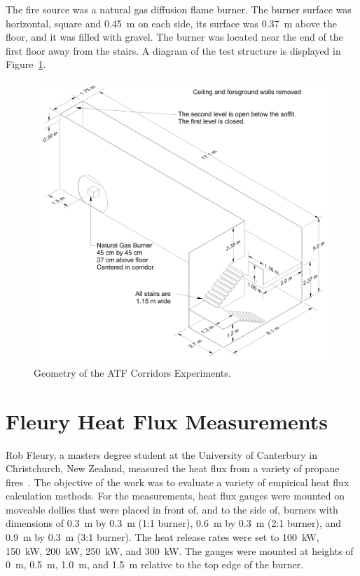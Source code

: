 The fire source was a natural gas diffusion flame burner.  The burner surface was horizontal, square and 0.45~m on each side, its surface was 0.37~m above the floor, and it was filled with gravel.
The burner was located near the end of the first floor away from the stairs. A diagram of the test structure is displayed in Figure~\ref{ATF Drawing}.


\begin{figure}[h]
\begin{center}
\includegraphics[width=6.5in]{FIGURES/ATF_Corridors/ATF_Corridors_Drawing}
\end{center}
\caption{Geometry of the ATF Corridors Experiments.}
\label{ATF Drawing}
\end{figure}


\section{Fleury Heat Flux Measurements}

Rob Fleury, a masters degree student at the University of Canterbury in Christchurch, New Zealand, measured the heat flux from a variety of propane fires~\cite{Fleury:Masters}.
The objective of the work was to evaluate a variety of empirical heat flux calculation methods. For the measurements, heat flux gauges were mounted on moveable dollies that
were placed in front of, and to the side of, burners with dimensions of 0.3~m by 0.3~m (1:1 burner), 0.6~m by 0.3~m (2:1 burner), and 0.9~m by 0.3~m (3:1 burner). The heat release
rates were set to 100~kW, 150~kW, 200~kW, 250~kW, and 300~kW. The gauges were mounted at heights of 0~m, 0.5~m, 1.0~m, and 1.5~m relative to the top edge of the burner.

